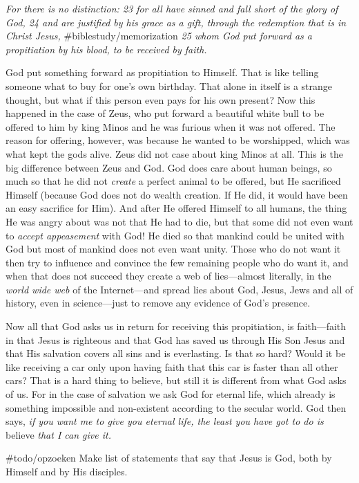 \emph{For there is no distinction: 23 for all have sinned and fall
short of the glory of God, 24 and are justified by his grace as a gift,
through the redemption that is in Christ Jesus,}
\#biblestudy/memorization \emph{25 whom God put forward as a
propitiation by his blood, to be received by faith.}

God put something forward as propitiation to Himself. That is like
telling someone what to buy for one's own birthday. That alone in itself
is a strange thought, but what if this person even pays for his own
present? Now this happened in the case of Zeus, who put forward a
beautiful white bull to be offered to him by king Minos and he was
furious when it was not offered. The reason for offering, however, was
because he wanted to be worshipped, which was what kept the gods alive.
Zeus did not case about king Minos at all. This is the big difference
between Zeus and God. God does care about human beings, so much so that
he did not \emph{create} a perfect animal to be offered, but He
sacrificed Himself (because God does not do wealth creation. If He did,
it would have been an easy sacrifice for Him). And after He offered
Himself to all humans, the thing He was angry about was not that He had
to die, but that some did not even want to \emph{accept appeasement}
with God! He died so that mankind could be united with God but most of
mankind does not even want unity. Those who do not want it then try to
influence and convince the few remaining people who do want it, and when
that does not succeed they create a web of lies---almost literally, in
the \emph{world wide web} of the Internet---and spread lies about God,
Jesus, Jews and all of history, even in science---just to remove any
evidence of God's presence.

Now all that God asks us in return for receiving this propitiation, is
faith---faith in that Jesus is righteous and that God has saved us
through His Son Jesus and that His salvation covers all sins and is
everlasting. Is that so hard? Would it be like receiving a car only upon
having faith that this car is faster than all other cars? That is a hard
thing to believe, but still it is different from what God asks of us.
For in the case of salvation we ask God for eternal life, which already
is something impossible and non-existent according to the secular world.
God then says, \emph{if you want me to give you eternal life, the least
you have got to do is} believe \emph{that I can give it.}

\#todo/opzoeken Make list of statements that say that Jesus is God, both
by Himself and by His disciples.

